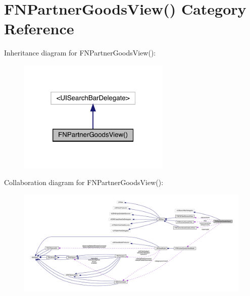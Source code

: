 \hypertarget{category_f_n_partner_goods_view_07_08}{}\section{F\+N\+Partner\+Goods\+View() Category Reference}
\label{category_f_n_partner_goods_view_07_08}


Inheritance diagram for F\+N\+Partner\+Goods\+View()\+:\nopagebreak
\begin{figure}[H]
\begin{center}
\leavevmode
\includegraphics[width=205pt]{category_f_n_partner_goods_view_07_08__inherit__graph}
\end{center}
\end{figure}


Collaboration diagram for F\+N\+Partner\+Goods\+View()\+:\nopagebreak
\begin{figure}[H]
\begin{center}
\leavevmode
\includegraphics[width=350pt]{category_f_n_partner_goods_view_07_08__coll__graph}
\end{center}
\end{figure}
